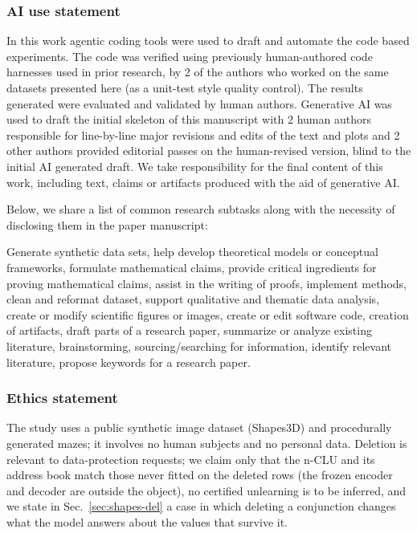 \documentclass{article} %
\begin{document}
\subsubsection*{AI use statement}
In this work agentic coding tools were used to draft and automate the code based experiments. The code was verified using previously human-authored code harnesses used in prior research, by 2 of the authors who worked on the same datasets presented here (as a unit-test style quality control). The results generated were evaluated and validated by human authors. Generative AI was used to draft the initial skeleton of this manuscript with 2 human authors responsible for line-by-line major revisions and edits of the text and plots and 2 other authors provided editorial passes on the human-revised version, blind to the initial AI generated draft. We take responsibility for the final content of this work, including text, claims or artifacts produced with the aid of generative AI.

Below, we share a list of common research subtasks along with the necessity of disclosing them in the paper manuscript:

Generate synthetic data sets, help develop theoretical models or conceptual frameworks, formulate mathematical claims, provide critical ingredients for proving mathematical claims, assist in the writing of proofs, implement methods, clean and reformat dataset, support qualitative and thematic data analysis, create or modify scientific figures or images, create or edit software code, creation of artifacts, draft parts of a research paper, summarize or analyze existing literature, brainstorming, sourcing/searching for information, identify relevant literature, propose keywords for a research paper.

\subsubsection*{Ethics statement}
The study uses a public synthetic image dataset (Shapes3D) and procedurally generated mazes; it
involves no human subjects and no personal data. Deletion is relevant to data-protection
requests; we claim only that the n-CLU and its address book match those never fitted on the deleted
rows (the frozen encoder and decoder are outside the object), no certified unlearning is to be inferred, and
we state in Sec.~\ref{sec:shapes-del} a case in which deleting a conjunction changes what the
model answers about the values that survive it.
\end{document}
